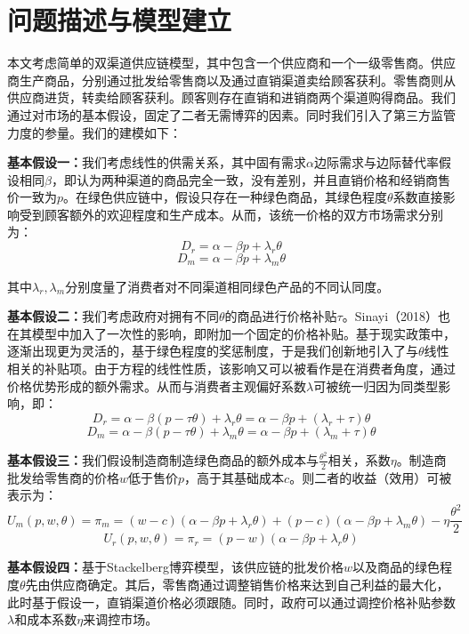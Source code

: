\documentclass{article}
\begin{document}
\section{问题描述与模型建立}
\par 本文考虑简单的双渠道供应链模型，其中包含一个供应商和一个一级零售商。供应商生产商品，分别通过批发给零售商以及通过直销渠道卖给顾客获利。零售商则从供应商进货，转卖给顾客获利。顾客则存在直销和进销商两个渠道购得商品。我们通过对市场的基本假设，固定了二者无需博弈的因素。同时我们引入了第三方监管力度的参量。我们的建模如下：
\par \textbf{基本假设一：}我们考虑线性的供需关系，其中固有需求$\alpha$边际需求与边际替代率假设相同$\beta$，即认为两种渠道的商品完全一致，没有差别，并且直销价格和经销商售价一致为$p$\cite{2016Li}。在绿色供应链中，假设只存在一种绿色商品，其绿色程度$\theta$系数直接影响受到顾客额外的欢迎程度和生产成本\cite{2012Ghosh}。从而，该统一价格的双方市场需求分别为：
\begin{equation}
    D_r=\alpha-\beta p+\lambda_r\theta
\end{equation}
\begin{equation}
    D_m=\alpha-\beta p+\lambda_m\theta
\end{equation}
\par 其中$\lambda_r, \lambda_m$分别度量了消费者对不同渠道相同绿色产品的不同认同度。
\par \textbf{基本假设二：}我们考虑政府对拥有不同$\theta$的商品进行价格补贴$\tau$。Sinayi（2018）也在其模型中加入了一次性的影响，即附加一个固定的价格补贴\cite{2018Sinayi}。基于现实政策中，逐渐出现更为灵活的，基于绿色程度的奖惩制度，于是我们创新地引入了与$\theta$线性相关的补贴项。由于方程的线性性质，该影响又可以被看作是在消费者角度，通过价格优势形成的额外需求。从而与消费者主观偏好系数$\lambda$可被统一归因为同类型影响，即：
\begin{equation}
    D_r=\alpha-\beta (p-\tau\theta)+\lambda_r\theta=\alpha-\beta p+(\lambda_r+\tau)\theta
\end{equation}
\begin{equation}
    D_m=\alpha-\beta (p-\tau\theta)+\lambda_m\theta=\alpha-\beta p+(\lambda_m+\tau)\theta
\end{equation}
\par \textbf{基本假设三：}我们假设制造商制造绿色商品的额外成本与$\frac{\theta^2}{2}$相关，系数$\eta$。制造商批发给零售商的价格$w$低于售价$p$，高于其基础成本$c$。则二者的收益（效用）可被表示为\cite{2012Ghosh}\cite{2016Li}：
\begin{equation}
    U_m(p,w,\theta)=\pi_m=(w-c)(\alpha-\beta p+\lambda_r\theta)+(p-c)(\alpha-\beta p+\lambda_m\theta)-\eta\frac{\theta^2}{2}
\end{equation}
\begin{equation}
    U_r(p,w,\theta)=\pi_r=(p-w)(\alpha-\beta p+\lambda_r\theta)
\end{equation}
\par \textbf{基本假设四：}基于Stackelberg博弈模型，该供应链的批发价格$w$以及商品的绿色程度$\theta$先由供应商确定。其后，零售商通过调整销售价格来达到自己利益的最大化\cite{2009Wang}，此时基于假设一，直销渠道价格必须跟随。同时，政府可以通过调控价格补贴参数$\lambda$和成本系数$\eta$来调控市场。
\end{document}
